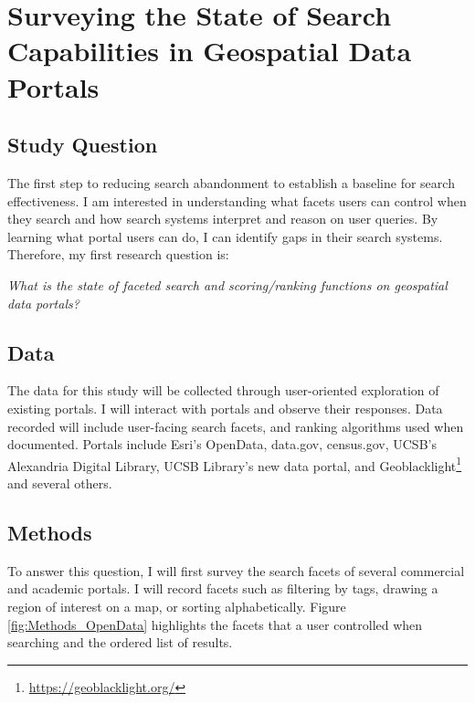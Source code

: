 \section{Surveying the State of Search Capabilities in Geospatial Data Portals}

\subsection{Study Question}
The first step to reducing search abandonment to establish a baseline for search effectiveness. I am interested in understanding what facets users can control when they search and how search systems interpret and reason on user queries. By learning what portal users can do, I can identify gaps in their search systems. Therefore, my first research question is:
\linebreak

\emph{What is the state of faceted search and scoring/ranking functions on geospatial data portals?}

\subsection{Data}
The data for this study will be collected through user-oriented exploration of existing portals. I will interact with portals and observe their responses. Data recorded will include user-facing search facets, and ranking algorithms used when documented. Portals include Esri's OpenData, data.gov, census.gov, UCSB's Alexandria Digital Library, UCSB Library's new data portal, and Geoblacklight\footnote{\url{https://geoblacklight.org/}} and several others.

\subsection{Methods}
To answer this question, I will first survey the search facets of several commercial and academic portals. I will record facets such as filtering by tags, drawing a region of interest on a map, or sorting alphabetically. Figure \ref{fig:Methods_OpenData} highlights the facets that a user controlled when searching and the ordered list of results.

